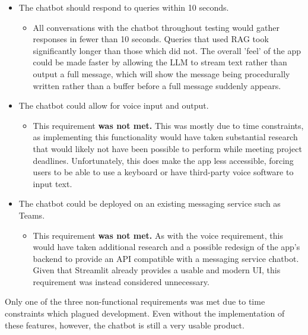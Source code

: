 \begin{itemize}
    \item The chatbot should respond to queries within 10 seconds.
    \begin{itemize}
        \item All conversations with the chatbot throughout testing would gather responses 
        in fewer than 10 seconds. Queries that used RAG took significantly longer than those which 
        did not. The overall 'feel' of the app could be made faster by allowing the LLM to stream 
        text rather than output a full message, which will show the message being procedurally written 
        rather than a buffer before a full message suddenly appears.
    \end{itemize}
    \item The chatbot could allow for voice input and output.
    \begin{itemize}
        \item This requirement \textbf{was not met.} This was mostly due to time constraints, as implementing this 
        functionality would have taken substantial research that would likely not have been possible to perform 
        while meeting project deadlines. Unfortunately, this does make the app less accessible, forcing users 
        to be able to use a keyboard or have third-party voice software to input text.
    \end{itemize}
    \item The chatbot could be deployed on an existing messaging service such as Teams.
    \begin{itemize}
        \item This requirement \textbf{was not met.} As with the voice requirement, this would have taken additional 
        research and a possible redesign of the app's backend to provide an API compatible with a messaging 
        service chatbot. Given that Streamlit already provides a usable and modern UI, this requirement was instead 
        considered unnecessary.
    \end{itemize}
\end{itemize}

\noindent Only one of the three non-functional requirements was met due to time constraints which plagued development.
Even without the implementation of these features, however, the chatbot is still a very usable product.